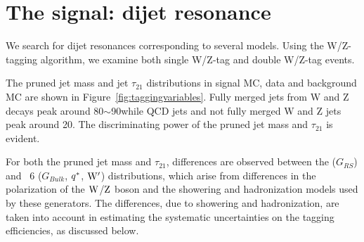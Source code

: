 \section{The signal: dijet resonance}
\label{sec:signal}

We search for dijet resonances corresponding to several models.
Using the W/Z-tagging algorithm, we examine both single W/Z-tag and double W/Z-tag events.

The pruned jet mass and jet $\tau_{21}$ distributions in signal MC, data and background MC are shown in Figure~\ref{fig:taggingvariables}.
Fully merged jets from W and Z decays peak around 80$\sim$90\GeVcc while QCD jets and not fully merged W and Z jets peak around 20\GeVcc.
The discriminating power of the pruned jet mass and $\tau_{21}$ is evident.

For both the pruned jet mass and $\tau_{21}$, differences are observed
between the \HERWIG{++} ($G_{RS}$) and \PYTHIA~6
($G_{Bulk}$, $q^*$, $\mathrm{W}^{\prime}$) distributions, which arise from
differences in the polarization of the ${\rm W}$/${\rm Z}$ boson and the
showering and hadronization models used by these generators. 
The differences, due to showering and hadronization,
are taken into account in estimating the systematic uncertainties
on the tagging efficiencies, as discussed below.

